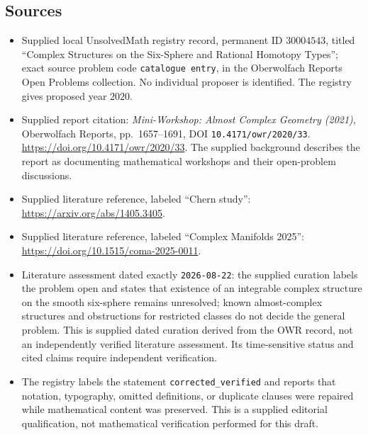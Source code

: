 \documentclass[11pt]{article}
\begin{document}
\subsection{Sources}
\begin{itemize}
\item Supplied local UnsolvedMath registry record, permanent ID \(30004543\), titled ``Complex Structures on the Six-Sphere and Rational Homotopy Types''; exact source problem code \texttt{catalogue entry}, in the Oberwolfach Reports Open Problems collection. No individual proposer is identified. The registry gives proposed year \(2020\).
\item Supplied report citation: \emph{Mini-Workshop: Almost Complex Geometry (2021)}, Oberwolfach Reports, pp.~1657--1691, DOI \texttt{10.4171/owr/2020/33}. \url{https://doi.org/10.4171/owr/2020/33}. The supplied background describes the report as documenting mathematical workshops and their open-problem discussions.
\item Supplied literature reference, labeled ``Chern study'': \url{https://arxiv.org/abs/1405.3405}.
\item Supplied literature reference, labeled ``Complex Manifolds 2025'': \url{https://doi.org/10.1515/coma-2025-0011}.
\item Literature assessment dated exactly \texttt{2026-08-22}: the supplied curation labels the problem open and states that existence of an integrable complex structure on the smooth six-sphere remains unresolved; known almost-complex structures and obstructions for restricted classes do not decide the general problem. This is supplied dated curation derived from the OWR record, not an independently verified literature assessment. Its time-sensitive status and cited claims require independent verification.
\item The registry labels the statement \texttt{corrected\_verified} and reports that notation, typography, omitted definitions, or duplicate clauses were repaired while mathematical content was preserved. This is a supplied editorial qualification, not mathematical verification performed for this draft.
\end{itemize}
\end{document}
